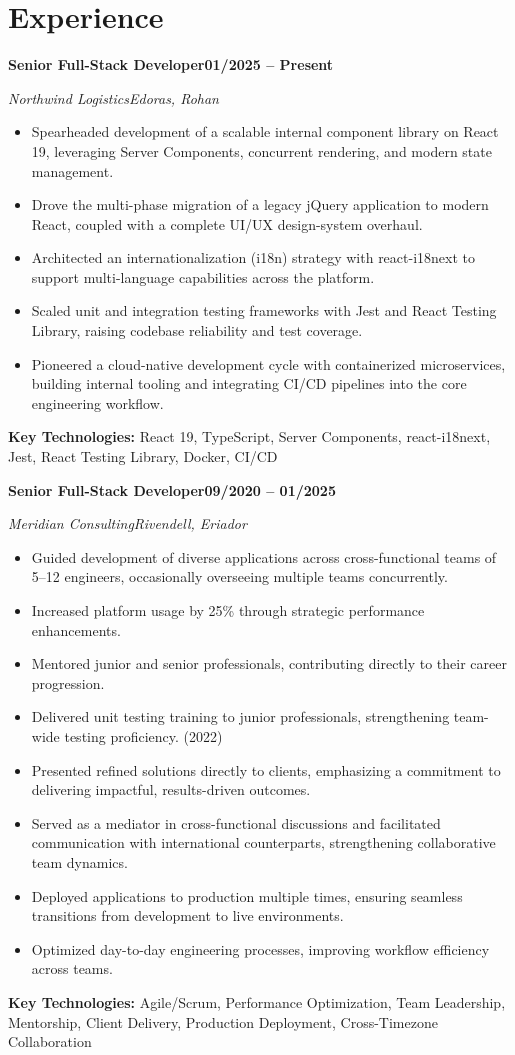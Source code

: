 \documentclass[letterpaper,11pt]{article}
\newlength{\cventrysep}\setlength{\cventrysep}{6pt}  %
\newcommand{\cvsection}[1]{\section{#1}}
\newcommand{\cventry}[4]{%
  \noindent\normalsize\textbf{#1}\hfill\small\textbf{#4}\par
  \nopagebreak[4]
  \noindent\normalsize\textit{\textcolor{accent}{#2}}\hfill\small\textit{#3}\par
  \nopagebreak[4]
}
\newcommand{\keytech}[1]{\small\textbf{Key Technologies:} #1\par}
\begin{document}
\vspace{\cventrysep}

\cvsection{Experience}

\cventry{Senior Full-Stack Developer}{Northwind Logistics}{Edoras, Rohan}{01/2025 -- Present}
\begin{itemize}\small
    \item Spearheaded development of a scalable internal component library on React 19, leveraging Server Components, concurrent rendering, and modern state management.
    \item Drove the multi-phase migration of a legacy jQuery application to modern React, coupled with a complete UI/UX design-system overhaul.
    \item Architected an internationalization (i18n) strategy with react-i18next to support multi-language capabilities across the platform.
    \item Scaled unit and integration testing frameworks with Jest and React Testing Library, raising codebase reliability and test coverage.
    \item Pioneered a cloud-native development cycle with containerized microservices, building internal tooling and integrating CI/CD pipelines into the core engineering workflow.
\end{itemize}
\keytech{React 19, TypeScript, Server Components, react-i18next, Jest, React Testing Library, Docker, CI/CD}

\vspace{\cventrysep}

\cventry{Senior Full-Stack Developer}{Meridian Consulting}{Rivendell, Eriador}{09/2020 -- 01/2025}
\begin{itemize}\small
    \item Guided development of diverse applications across cross-functional teams of 5--12 engineers, occasionally overseeing multiple teams concurrently.
    \item Increased platform usage by 25\% through strategic performance enhancements.
    \item Mentored junior and senior professionals, contributing directly to their career progression.
    \item Delivered unit testing training to junior professionals, strengthening team-wide testing proficiency. (2022)
    \item Presented refined solutions directly to clients, emphasizing a commitment to delivering impactful, results-driven outcomes.
    \item Served as a mediator in cross-functional discussions and facilitated communication with international counterparts, strengthening collaborative team dynamics.
    \item Deployed applications to production multiple times, ensuring seamless transitions from development to live environments.
    \item Optimized day-to-day engineering processes, improving workflow efficiency across teams.
\end{itemize}
\keytech{Agile/Scrum, Performance Optimization, Team Leadership, Mentorship, Client Delivery, Production Deployment, Cross-Timezone Collaboration}
\end{document}
